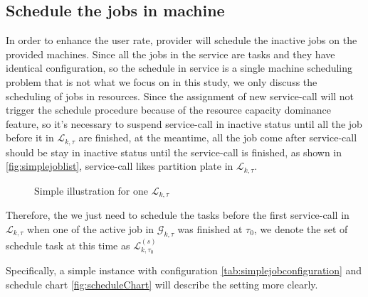 \subsection{Schedule the jobs in machine} %
\label{sub:schedule_the_jobs_in_machine}
In order to enhance the user rate, provider will schedule the inactive jobs on the provided machines. Since all the jobs in the service are tasks and they have identical configuration, so the schedule in service is a single machine scheduling problem that is not what we focus on in this study, we only discuss the scheduling of jobs in resources. Since the assignment of new service-call will not trigger the schedule procedure because of the resource capacity dominance feature, so it's necessary to suspend service-call in inactive status until all the job before it in $\mathcal{L}_{k,\tau}$ are finished, at the meantime, all the job come after service-call should be stay in inactive status until the service-call is finished, as shown in \autoref{fig:simplejoblist}, service-call likes partition plate in $\mathcal{L}_{k,\tau}$.  
\begin{figure}[htbp]
	\centering
	\resizebox{.75\textwidth}{!}{}
	\caption{Simple illustration for one $\mathcal{L}_{k,\tau}$}
	\label{fig:simplejoblist}
\end{figure}
Therefore, the we just need to schedule the tasks before the first service-call in $\mathcal{L}_{k,\tau}$ when one of the active job in $\mathcal{G}_{k,\tau}$ was finished at $\tau_0$, we denote the set of schedule task at this time as $\mathcal{L}^{(s)}_{k,\tau_0}$

Specifically, a simple instance with configuration \autoref{tab:simplejobconfiguration} and schedule chart \autoref{fig:scheduleChart} will describe the setting more clearly.

